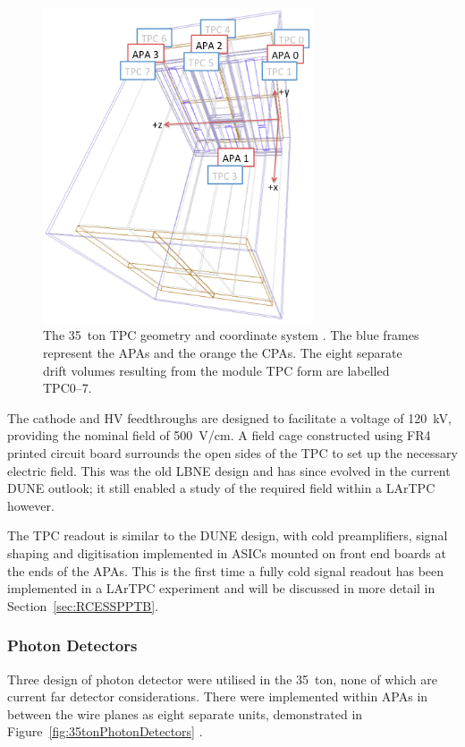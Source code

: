 \begin{figure}
  \centering
  \includegraphics[width=8cm]{35tonGeometry.png}
  \caption[The 35~ton TPC geometry.]{The 35~ton TPC geometry and coordinate system \cite{Alion2014}.  The blue frames represent the APAs and the orange the CPAs.  The eight separate drift volumes resulting from the module TPC form are labelled TPC0--7.}
  \label{fig:35tonGeometry}
\end{figure}

The cathode and HV feedthroughs are designed to facilitate a voltage of 120~kV, providing the nominal field of 500~V/cm.  A field cage constructed using FR4 printed circuit board surrounds the open sides of the TPC to set up the necessary electric field.  This was the old LBNE design and has since evolved in the current DUNE outlook; it still enabled a study of the required field within a LArTPC however.

The TPC readout is similar to the DUNE design, with cold preamplifiers, signal shaping and digitisation implemented in ASICs mounted on front end boards at the ends of the APAs.  This is the first time a fully cold signal readout has been implemented in a LArTPC experiment and will be discussed in more detail in Section~\ref{sec:RCESSPPTB}.

\subsubsection{Photon Detectors}\label{sec:35tonPhotonDetectors}

Three design of photon detector were utilised in the 35~ton, none of which are current far detector considerations.  There were implemented within APAs in between the wire planes as eight separate units, demonstrated in Figure~\ref{fig:35tonPhotonDetectors} \cite{35tonPhotonDetectors}.

